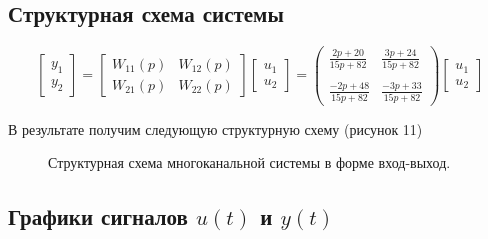 \documentclass[a5paper, 10pt]{article}
\theoremstyle{definition}
\theoremstyle{plain}
\theoremstyle{remark}
\begin{document}
\subsection{Структурная схема системы}
\begin{equation*}
\begin{bmatrix}
y_1\\
y_2
\end{bmatrix}
=
\begin{bmatrix}
W_{11}(p) & W_{12}(p)\\
W_{21}(p) & W_{22}(p)
\end{bmatrix}
\begin{bmatrix}
u_1\\
u_2
\end{bmatrix}
=
\begin{pmatrix}
\frac{2p+20}{15p+82} & \frac{3p+24}{15p+82}\\\\
\frac{-2p+48}{15p+82} & \frac{-3p+33}{15p+82}
\end{pmatrix}
\begin{bmatrix}
u_1\\
u_2
\end{bmatrix}
\end{equation*}

В результате получим следующую структурную схему (рисунок 11)

\begin{figure}[h]
\caption{Структурная схема многоканальной системы в форме вход-выход.}
\end{figure}



\newpage
\subsection{Графики сигналов $u(t)$ и $y(t)$}
\end{document}
